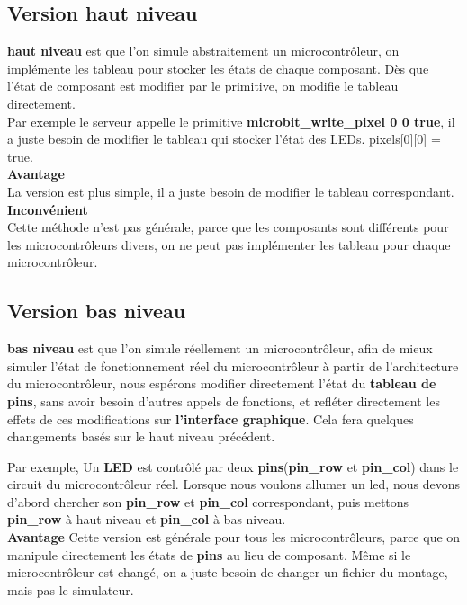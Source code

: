 \documentclass[14px]{article}
\begin{document}
\subsection{Version haut niveau}
\textbf{haut niveau} est que l'on simule abstraitement un microcontrôleur, on implémente les tableau pour stocker les états de chaque composant. Dès que l'état de composant est modifier par le primitive, on modifie le tableau directement.\\
Par exemple le serveur appelle le primitive \textbf{microbit\_write\_pixel 0 0 true}, il a juste besoin de modifier le tableau qui stocker l'état des LEDs. pixels[0][0] = true.\\

\textbf{Avantage}\\
La version est plus simple, il a juste besoin de modifier le tableau correspondant.\\

\textbf{Inconvénient}\\
Cette méthode n'est pas générale, parce que les composants sont différents pour les microcontrôleurs divers, on ne peut pas implémenter les tableau pour chaque microcontrôleur.

\subsection{Version bas niveau}
\textbf{bas niveau} est que l'on simule réellement un microcontrôleur, afin de mieux simuler l'état de fonctionnement réel du microcontrôleur à partir de l'architecture du microcontrôleur, nous espérons modifier directement l'état du \textbf{tableau de pins}, sans avoir besoin d'autres appels de fonctions, et refléter directement les effets de ces modifications sur \textbf{l'interface graphique}. Cela fera quelques changements basés sur le haut niveau précédent.

Par exemple, Un \textbf{LED} est contrôlé par deux \textbf{pins}(\textbf{pin\_row} et \textbf{pin\_col}) dans le circuit du microcontrôleur réel. Lorsque nous voulons allumer un led, nous devons d'abord chercher son \textbf{pin\_row} et \textbf{pin\_col} correspondant, puis mettons \textbf{pin\_row} à haut niveau et \textbf{pin\_col} à bas niveau.\\

\textbf{Avantage}
Cette version est générale pour tous les microcontrôleurs, parce que on manipule directement les états de \textbf{pins} au lieu de composant. Même si le microcontrôleur est changé, on a juste besoin de changer un fichier du montage, mais pas le simulateur.\\
\end{document}
